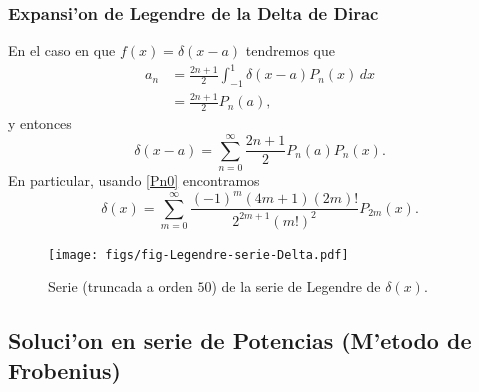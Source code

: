\subsubsection{Expansi'on de Legendre de la Delta de Dirac}
En el caso en que $f(x)=\delta(x-a)$ tendremos que
\begin{align}
a_n &= \frac{2n+1}{2}\int_{-1}^1 \delta(x-a)P_n(x)\,dx \\
&= \frac{2n+1}{2}P_n(a),
\end{align}
y entonces
\begin{equation}
\delta(x-a)=\sum_{n=0}^\infty \frac{2n+1}{2}P_n(a)P_n(x).
\end{equation}
En particular, usando \eqref{Pn0} encontramos
\begin{equation}
\delta(x)=\sum_{m=0}^\infty \frac{(-1)^m(4m+1)(2m)!}{2^{2m+1}(m!)^2}P_{2m}(x).
\end{equation}

\begin{figure}[H]
\centering
\texttt{[image: figs/fig-Legendre-serie-Delta.pdf]}
\caption{Serie (truncada a orden $50$) de la serie de Legendre de $\delta(x)$.}
\label{fig-DSL}
\end{figure}

\subsection{Soluci'on en serie de Potencias (M'etodo de Frobenius)}\label{sec:FrobLeg}

